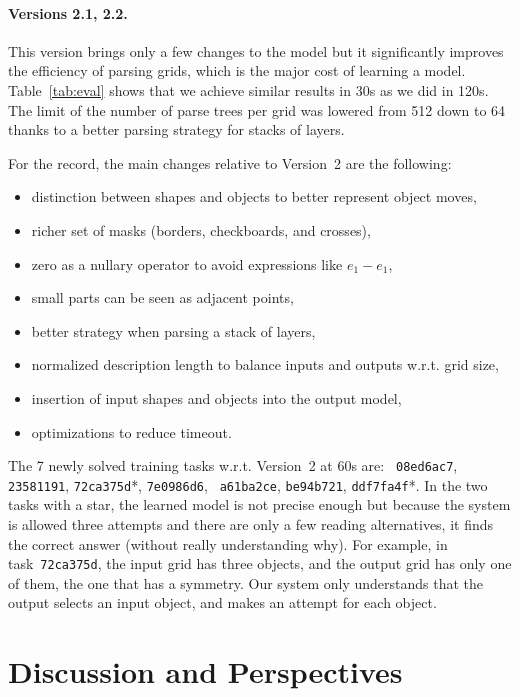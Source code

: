 \documentclass[a4paper]{llncs}
\begin{document}
\paragraph{Versions 2.1, 2.2.} This version brings only a few changes to the
model but it significantly improves the efficiency of parsing grids,
which is the major cost of learning a model. Table~\ref{tab:eval}
shows that we achieve similar results in 30s as we did in 120s. The
limit of the number of parse trees per grid was lowered from 512 down
to 64 thanks to a better parsing strategy for stacks of layers.

For the record, the main changes relative to Version~2 are the following:
\begin{itemize}
\item distinction between shapes and objects to better represent object moves,
\item richer set of masks (borders, checkboards, and crosses),
\item zero as a nullary operator to avoid expressions like $e_1 - e_1$,
\item small parts can be seen as adjacent points,
\item better strategy when parsing a stack of layers,
\item normalized description length to balance inputs and outputs w.r.t. grid size,
\item insertion of input shapes and objects into the output model,
\item optimizations to reduce timeout.
\end{itemize}

The 7 newly solved training tasks w.r.t. Version~2 at 60s are: {\tt
  08ed6ac7}, {\tt 23581191}, {\tt 72ca375d}*, {\tt 7e0986d6}, {\tt
  a61ba2ce}, {\tt be94b721}, {\tt ddf7fa4f}*. In the two tasks with a
star, the learned model is not precise enough but because the system
is allowed three attempts and there are only a few reading
alternatives, it finds the correct answer (without really
understanding why). For example, in task~{\tt 72ca375d}, the input
grid has three objects, and the output grid has only one of them, the
one that has a symmetry. Our system only understands that the output
selects an input object, and makes an attempt for each object.


\section{Discussion and Perspectives}
\label{conclu}
\end{document}
